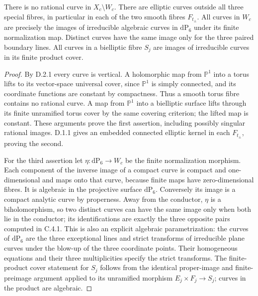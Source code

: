 \begin{proposition}[D.2.2; Proved]\label{st:D.2.2}
There is no rational curve in \(X_c\setminus W_c\). There are elliptic
curves outside all three special fibres, in particular in each of the
two smooth fibres \(F_{t_\pm}\). All curves in \(W_c\) are precisely the
images of irreducible algebraic curves in \(\mathrm{dP}_6\) under its
finite normalization map. Distinct curves have the same image only for
the three paired boundary lines. All curves in a bielliptic fibre
\(S_j\) are images of irreducible curves in its finite product cover.
\end{proposition}
\begin{proof}
By D.2.1 every curve is vertical. A holomorphic map from
\(\mathbb P^1\) into a torus lifts to its vector-space universal cover,
since \(\mathbb P^1\) is simply connected, and its coordinate functions
are constant by compactness. Thus a smooth torus fibre contains no
rational curve. A map from \(\mathbb P^1\) into a bielliptic surface
lifts through its finite unramified torus cover by the same covering
criterion; the lifted map is constant. These arguments prove the first
assertion, including possibly singular rational images.
D.1.1 gives an embedded connected elliptic kernel in each \(F_{t_\pm}\),
proving the second.

For the third assertion let \(\eta:\mathrm{dP}_6\to W_c\) be the finite
normalization morphism. Each component of the inverse image of a compact
curve is compact and one-dimensional and maps onto that curve, because
finite maps have zero-dimensional fibres. It is algebraic in the
projective surface \(\mathrm{dP}_6\). Conversely its image is a compact
analytic curve by properness. Away from the conductor, \(\eta\) is a
biholomorphism, so two distinct curves can have the same image only when
both lie in the conductor; its identifications are exactly the three
opposite pairs computed in C.4.1. This is also an explicit algebraic
parametrization: the curves of \(\mathrm{dP}_6\) are the three exceptional
lines and strict transforms of irreducible plane curves under the blow-up
of the three coordinate points. Their homogeneous equations and their
three multiplicities specify the strict transforms. The finite-product
cover statement for \(S_j\) follows from the identical proper-image and
finite-preimage argument applied to its unramified morphism
\(E_j\times F_j\to S_j\); curves in the product are algebraic.
\end{proof}

